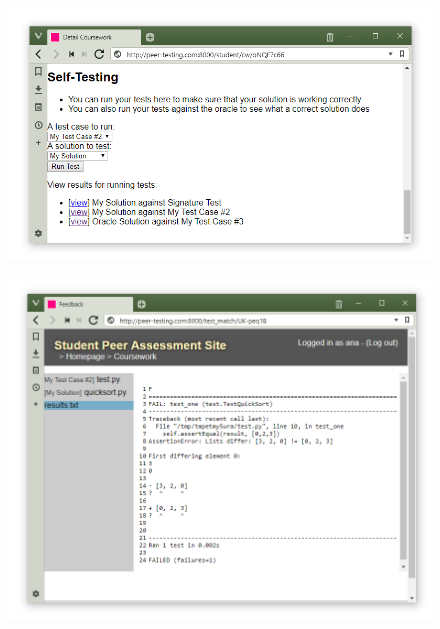 \documentclass[sigplan,10pt,review]{acmart}\settopmatter{printfolios=true}
\begin{document}
\begin{figure}
\begin{minipage}{.45\linewidth}
\begin{minipage}[t]{1\linewidth}
  \centering
  \includegraphics[width=1\linewidth]{screenshot-stage1-2}
  \label{fig:stage-1-2}
\end{minipage}%
  \end{minipage}\hfil%
  \begin{minipage}{.45\linewidth}
\begin{minipage}[t]{1\linewidth}
  \centering
  \includegraphics[width=1\linewidth]{screenshot-stage1-3}
  \label{fig:stage-1-3}
\end{minipage}%


\end{minipage}
\end{figure}
\end{document}
